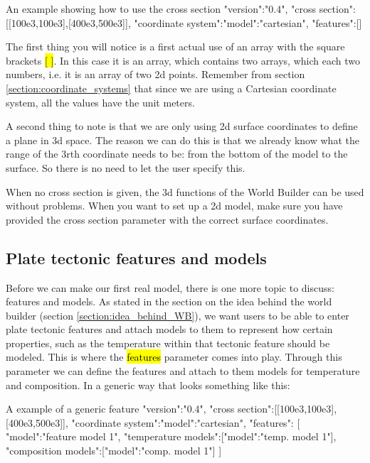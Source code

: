 \documentclass{book}
\newcommand{\WB}{{World Builder}}
\begin{document}
\begin{javascriptcode}{An example showing how to use the cross section}{}
{
  "version":"0.4",
  "cross section":[[100e3,100e3],[400e3,500e3]],
  "coordinate system":{"model":"cartesian"},
  "features":[]
}
\end{javascriptcode}

The first thing you will notice is a first actual use of an array with the square brackets \hl{[ ]}. In this case it is an array, which contains two arrays, which each two numbers, i.e. it is an array of two 2d points. Remember from section \ref{section:coordinate_systems} that since we are using a Cartesian coordinate system, all the values have the unit meters. 

A second thing to note is that we are only using 2d surface coordinates to define a plane in 3d space. The reason we can do this is that we already know what the range of the 3rth coordinate needs to be: from the bottom of the model to the surface. So there is no need to let the user specify this.

When no cross section is given, the 3d functions of the \WB{} can be used without problems. When you want to set up a 2d model, make sure you have provided the cross section parameter with the correct surface coordinates.

\subsection{Plate tectonic features and models}
Before we can make our first real model, there is one more topic to discuss: features and models. As stated in the section on the idea behind the world builder (section \ref{section:idea_behind_WB}), we want users to be able to enter plate tectonic features and attach models to them to represent how certain properties, such as the temperature within that tectonic feature should be modeled. This is where the \hl{features} parameter comes into play. Through this parameter we can define the features and attach to them models for temperature and composition. In a generic way that looks something like this:

\begin{javascriptcode}{A example of a generic feature}{}
{
  "version":"0.4",
  "cross section":[[100e3,100e3],[400e3,500e3]],
  "coordinate system":{"model":"cartesian"},
  "features":
  [
    {
      "model":"feature model 1",
      "temperature models":[{"model":"temp. model 1"}],
      "composition models":[{"model":"comp. model 1"}]
    }
  ]
}
\end{javascriptcode}
\end{document}
